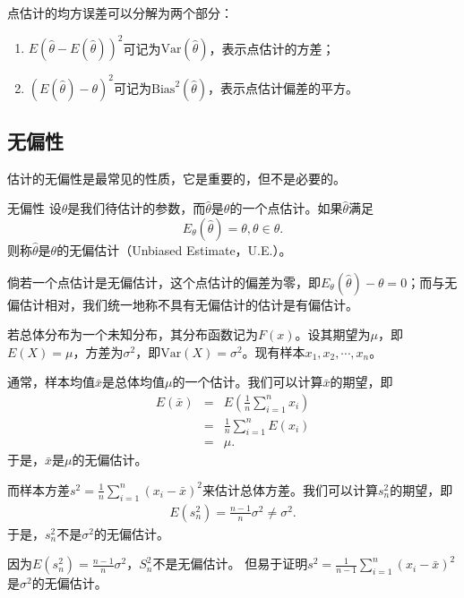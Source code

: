 \begin{remark}
    点估计的均方误差可以分解为两个部分：
    \begin{enumerate}
        \item $E(\hat{\theta}-E(\hat{\theta}))^{2}$可记为$\text{Var}(\hat{\theta})$，表示点估计的方差；
        \item $(E(\hat{\theta})-\theta)^{2} $可记为$\text{Bias}^2(\hat{\theta})$，表示点估计偏差的平方。
    \end{enumerate}
\end{remark}



\subsection{无偏性}

估计的无偏性是最常见的性质，它是重要的，但不是必要的。

\begin{definition}{无偏性}
	设$\theta$是我们待估计的参数，而$\hat{\theta}$是$\theta$的一个点估计。如果$\hat{\theta}$满足
	$$
	E_{\theta} (\hat{\theta}) = \theta, \theta \in \theta.
	$$
	则称$\hat{\theta}$是$\theta$的无偏估计（Unbiased  Estimate，U.E.）。
\end{definition}
\begin{remark}
    倘若一个点估计是无偏估计，这个点估计的偏差为零，即$E_{\theta} (\hat{\theta}) -\theta =0$；而与无偏估计相对，我们统一地称不具有无偏估计的估计是有偏估计。
\end{remark}

\begin{example}
	若总体分布为一个未知分布，其分布函数记为$F(x)$。设其期望为$\mu$，即$E(X) = \mu$，方差为$\sigma^2$，即$\text{Var}(X) =\sigma^2$。现有样本$x_1,x_2,\cdots,x_n$。

通常，样本均值$\bar{x}$是总体均值$\mu$的一个估计。我们可以计算$\bar{x}$的期望，即
    \begin{eqnarray*}
        E(\bar{x}) &=& E\left( \frac{1}{n} \sum_{i=1}^{n} x_{i} \right)\\
        &=& \frac{1}{n} \sum_{i=1}^{n} E\left(x_{i}\right)\\
        &=&\mu.
    \end{eqnarray*}
  于是，$\bar{x}$是$\mu$的无偏估计。

而样本方差$s^2 = \frac{1}{n} \sum_{i=1}^{n}\left(x_{i}-\bar{x}\right)^{2}$来估计总体方差。我们可以计算$s_n^2$的期望，即
\begin{eqnarray*}
    E(s_n^2) =  \frac{n-1}{n} \sigma^{2} \neq \sigma^2.
\end{eqnarray*}
    于是，$s_n^2$不是$\sigma^2$的无偏估计。
    
因为$E\left(s_{n}^{2}\right)=\frac{n-1}{n} \sigma^{2}$，$S_{n}^{2}$不是无偏估计。 但易于证明$s^2 = \frac{1}{n-1}\sum_{i=1}^n (x_i-\bar{x})^2$是$\sigma^2$的无偏估计。
\end{example}


